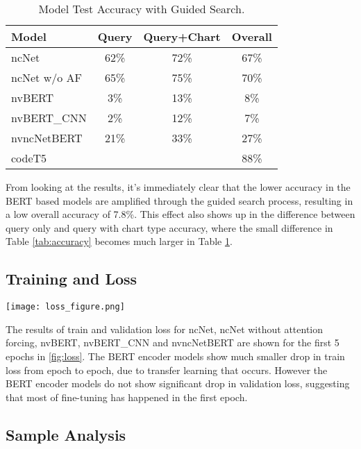 \documentclass[
	a4paper, %
	10pt, %
	unnumberedsections, %
	twoside, %
]{t0003}
\begin{document}
\begin{table} %
	\caption{Model Test Accuracy with Guided Search.}
	\centering
	\begin{tabular}{lccc}
		\toprule
		Model & Query & Query+Chart & Overall  \\
		\midrule
		ncNet & 62\% &72\% & 67\% \\
		ncNet w/o AF & 65\% & 75\% & 70\%  \\
		\hline
		nvBERT & 3\% & 13\% & 8\% \\
		nvBERT\_CNN &  2\% & 12\% & 7\% \\
		\hline
		nvncNetBERT & 21\% & 33\% & 27\% \\
		\hline
		codeT5 & & & 88\% \\
		\bottomrule
	\end{tabular}
	\label{tab:guidedaccuracy}
\end{table}

From looking at the results, it's immediately clear that the lower accuracy in the BERT based models are amplified through the guided search process, resulting in a low overall accuracy of 7.8\%. This effect also shows up in the difference between query only and query with chart type accuracy, where the small difference in Table \ref{tab:accuracy} becomes much larger in Table \ref{tab:guidedaccuracy}.

\subsection{Training and Loss}

\begin{figure*}
	\texttt{[image: loss\_figure.png]}
	\caption{Train and Validation Loss of Models.}
	\label{fig:loss}
\end{figure*}

The results of train and validation loss for ncNet, ncNet without attention forcing, nvBERT, nvBERT\_CNN and nvncNetBERT are shown for the first 5 epochs in \ref{fig:loss}. The BERT encoder models show much smaller drop in train loss from epoch to epoch, due to transfer learning that occurs. However the BERT encoder models do not show significant drop in validation loss, suggesting that most of fine-tuning has happened in the first epoch.

\subsection{Sample Analysis}
\end{document}
